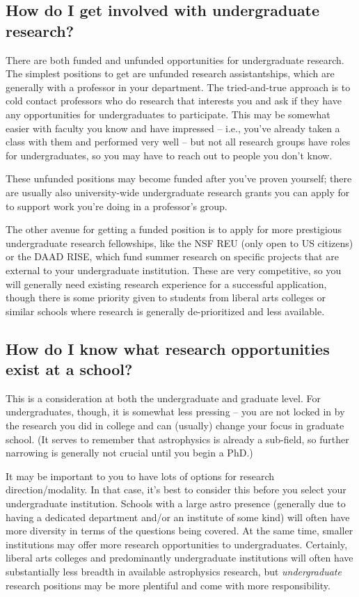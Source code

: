 \subsection{How do I get involved with undergraduate research?}

There are both funded and unfunded opportunities for undergraduate research. The simplest positions to get are unfunded research assistantships, which are generally with a professor in your department. The tried-and-true approach is to cold contact professors who do research that interests you and ask if they have any opportunities for undergraduates to participate. This may be somewhat easier with faculty you know and have impressed -- i.e., you've already taken a class with them and performed very well -- but not all research groups have roles for undergraduates, so you may have to reach out to people you don't know.

These unfunded positions may become funded after you've proven yourself; there are usually also university-wide undergraduate research grants you can apply for to support work you're doing in a professor's group.

The other avenue for getting a funded position is to apply for more prestigious undergraduate research fellowships, like the NSF REU (only open to US citizens) or the DAAD RISE, which fund summer research on specific projects that are external to your undergraduate institution. These are very competitive, so you will generally need existing research experience for a successful application, though there is some priority given to students from liberal arts colleges or similar schools where research is generally de-prioritized and less available.

\subsection{How do I know what research opportunities exist at a school?}

This is a consideration at both the undergraduate and graduate level. For undergraduates, though, it is somewhat less pressing -- you are not locked in by the research you did in college and can (usually) change your focus in graduate school. (It serves to remember that astrophysics is already a sub-field, so further narrowing is generally not crucial until you begin a PhD.) 

It may be important to you to have lots of options for research direction/modality. In that case, it's best to consider this before you select your undergraduate institution. Schools with a large astro presence (generally due to having a dedicated department and/or an institute of some kind) will often have more diversity in terms of the questions being covered. At the same time, smaller institutions may offer more research opportunities to undergraduates. Certainly, liberal arts colleges and predominantly undergraduate institutions will often have substantially less breadth in available astrophysics research, but \textit{undergraduate} research positions may be more plentiful and come with more responsibility.


